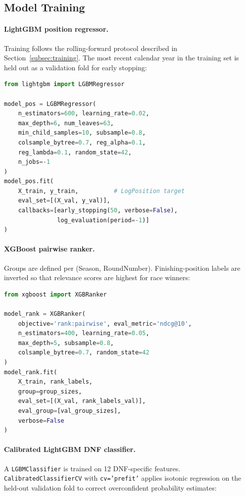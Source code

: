\documentclass[12pt, a4paper, oneside]{report}
\begin{document}
\subsection{Model Training}
\label{subsec:model-training}

\paragraph{LightGBM position regressor.}
Training follows the rolling-forward protocol described in
Section~\ref{subsec:training}. The most recent calendar year in the training
set is held out as a validation fold for early stopping:

\begin{lstlisting}[language=Python,
  caption={LightGBM position regressor training (simplified).}]
from lightgbm import LGBMRegressor

model_pos = LGBMRegressor(
    n_estimators=600, learning_rate=0.02,
    max_depth=6, num_leaves=63,
    min_child_samples=10, subsample=0.8,
    colsample_bytree=0.7, reg_alpha=0.1,
    reg_lambda=0.1, random_state=42,
    n_jobs=-1
)
model_pos.fit(
    X_train, y_train,          # LogPosition target
    eval_set=[(X_val, y_val)],
    callbacks=[early_stopping(50, verbose=False),
               log_evaluation(period=-1)]
)
\end{lstlisting}

\paragraph{XGBoost pairwise ranker.}
Groups are defined per (Season, RoundNumber). Finishing-position labels are
inverted so that relevance scores are highest for race winners:

\begin{lstlisting}[language=Python,
  caption={XGBoost pairwise ranker training (simplified).}]
from xgboost import XGBRanker

model_rank = XGBRanker(
    objective='rank:pairwise', eval_metric='ndcg@10',
    n_estimators=400, learning_rate=0.05,
    max_depth=5, subsample=0.8,
    colsample_bytree=0.7, random_state=42
)
model_rank.fit(
    X_train, rank_labels,
    group=group_sizes,
    eval_set=[(X_val, rank_labels_val)],
    eval_group=[val_group_sizes],
    verbose=False
)
\end{lstlisting}

\paragraph{Calibrated LightGBM DNF classifier.}
A \texttt{LGBMClassifier} is trained on 12 DNF-specific features.
\texttt{CalibratedClassifierCV} with \texttt{cv='prefit'} applies isotonic
regression on the held-out validation fold to correct overconfident probability
estimates:
\end{document}
